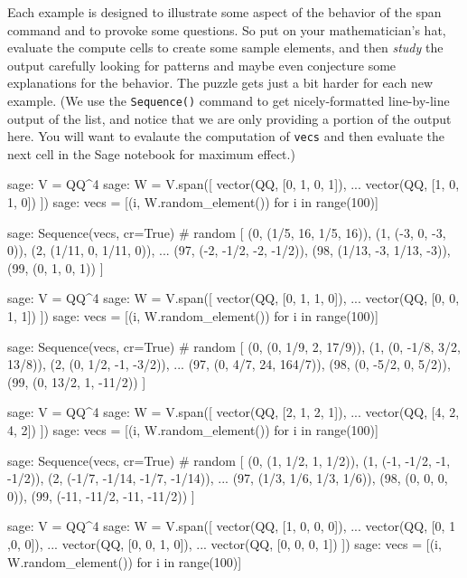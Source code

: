 %
Each example is designed to illustrate some aspect of the behavior of the span command and to provoke some questions.  So put on your mathematician's hat, evaluate the compute cells to create some sample elements, and then \emph{study} the output carefully looking for patterns and maybe even conjecture some explanations for the behavior.  The puzzle gets just a bit harder for each new example.  (We use the \texttt{Sequence()} command to get nicely-formatted line-by-line output of the list, and notice that we are only providing a portion of the output here.  You will want to evalaute the computation of \texttt{vecs} and then evaluate the next cell in the Sage notebook for maximum effect.)
%
\begin{sageexample}
sage: V = QQ^4
sage: W = V.span([ vector(QQ, [0, 1, 0, 1]),
...                vector(QQ, [1, 0, 1, 0]) ])
sage: vecs = [(i, W.random_element()) for i in range(100)]
\end{sageexample}
%
\begin{sageexample}
sage: Sequence(vecs, cr=True)          # random
[
(0, (1/5, 16, 1/5, 16)),
(1, (-3, 0, -3, 0)),
(2, (1/11, 0, 1/11, 0)),
...
(97, (-2, -1/2, -2, -1/2)),
(98, (1/13, -3, 1/13, -3)),
(99, (0, 1, 0, 1))
]
\end{sageexample}
%
\begin{sageexample}
sage: V = QQ^4
sage: W = V.span([ vector(QQ, [0, 1, 1, 0]),
...                vector(QQ, [0, 0, 1, 1]) ])
sage: vecs = [(i, W.random_element()) for i in range(100)]
\end{sageexample}
%
\begin{sageexample}
sage: Sequence(vecs, cr=True)          # random
[
(0, (0, 1/9, 2, 17/9)),
(1, (0, -1/8, 3/2, 13/8)),
(2, (0, 1/2, -1, -3/2)),
...
(97, (0, 4/7, 24, 164/7)),
(98, (0, -5/2, 0, 5/2)),
(99, (0, 13/2, 1, -11/2))
]
\end{sageexample}
%
\begin{sageexample}
sage: V = QQ^4
sage: W = V.span([ vector(QQ, [2, 1, 2, 1]),
...                vector(QQ, [4, 2, 4, 2]) ])
sage: vecs = [(i, W.random_element()) for i in range(100)]
\end{sageexample}
%
\begin{sageexample}
sage: Sequence(vecs, cr=True)          # random
[
(0, (1, 1/2, 1, 1/2)),
(1, (-1, -1/2, -1, -1/2)),
(2, (-1/7, -1/14, -1/7, -1/14)),
...
(97, (1/3, 1/6, 1/3, 1/6)),
(98, (0, 0, 0, 0)),
(99, (-11, -11/2, -11, -11/2))
]
\end{sageexample}
%
\begin{sageexample}
sage: V = QQ^4
sage: W = V.span([ vector(QQ, [1, 0, 0, 0]),
...                vector(QQ, [0, 1 ,0, 0]),
...                vector(QQ, [0, 0, 1, 0]),
...                vector(QQ, [0, 0, 0, 1]) ])
sage: vecs = [(i, W.random_element()) for i in range(100)]
\end{sageexample}

